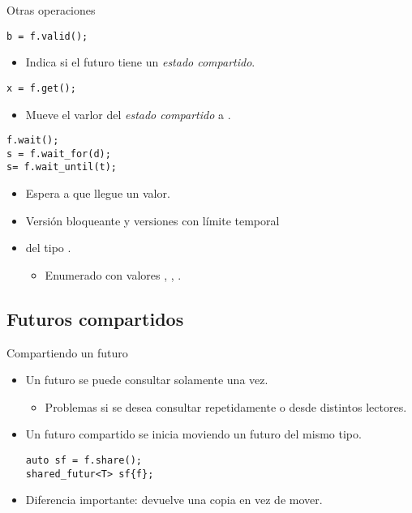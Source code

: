 \begin{frame}[fragile]{Otras operaciones}
\begin{lstlisting}
b = f.valid();
\end{lstlisting}
\begin{itemize}
\item Indica si el futuro tiene un \emph{estado compartido}.
\end{itemize}

\begin{lstlisting}
x = f.get();
\end{lstlisting}
\begin{itemize}
\item Mueve el varlor del \emph{estado compartido} a .
\end{itemize}

\begin{lstlisting}
f.wait();
s = f.wait_for(d);
s= f.wait_until(t);
\end{lstlisting}
\begin{itemize}
  \item Espera a que llegue un valor.
  \item Versión bloqueante y versiones con límite temporal
  \item {} del tipo .
    \begin{itemize}
      \item Enumerado con valores , , .
    \end{itemize}
\end{itemize}
\end{frame}

\subsection{Futuros compartidos}

\begin{frame}[fragile]{Compartiendo un futuro}
\begin{itemize}
  \item Un futuro se puede consultar solamente una vez.
    \begin{itemize}
      \item Problemas si se desea consultar repetidamente o desde distintos lectores.
    \end{itemize}
  \item Un futuro compartido se inicia moviendo un futuro del mismo tipo.
\begin{lstlisting}
auto sf = f.share();
shared_futur<T> sf{f};
\end{lstlisting}
  \item Diferencia importante:  devuelve una copia en vez de mover.
\end{itemize}
\end{frame}

